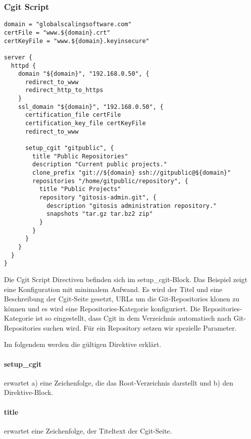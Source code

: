\subsubsection{Cgit Script}

\begin{lstlisting}[style=Java, caption=Beispiel Cgit Script]
domain = "globalscalingsoftware.com"
certFile = "www.${domain}.crt"
certKeyFile = "www.${domain}.keyinsecure"

server {
  httpd {
    domain "${domain}", "192.168.0.50", {
      redirect_to_www
      redirect_http_to_https
    }
    ssl_domain "${domain}", "192.168.0.50", {
      certification_file certFile
      certification_key_file certKeyFile
      redirect_to_www

      setup_cgit "gitpublic", {
        title "Public Repositories"
        description "Current public projects."
        clone_prefix "git://${domain} ssh://gitpublic@${domain}"
        repositories "/home/gitpublic/repository", {
          title "Public Projects"
          repository "gitosis-admin.git", {
            description "gitosis administration repository."
            snapshots "tar.gz tar.bz2 zip"
          }
        }
      }
    }
  }
}
\end{lstlisting}

Die Cgit Script Directiven befinden sich im setup\_cgit-Block. Das Beispiel
zeigt eine Konfiguration mit minimalem Aufwand. Es wird der Titel und eine
Beschreibung der Cgit-Seite gesetzt, URLs um die Git-Repositories klonen zu
können und es wird eine Repositories-Kategorie konfiguriert. Die
Repositories-Kategorie ist so eingestellt, dass Cgit in dem Verzeichnis
automatisch nach Git-Repositories suchen wird. Für ein Repository setzen wir
spezielle Parameter.

Im folgendem werden die gültigen Direktive erklärt.

\paragraph{setup\_cgit}

 erwartet a) eine Zeichenfolge, die das Root-Verzeichnis
darstellt und b) den Direktive-Block.

\paragraph{title}

 erwartet eine Zeichenfolge, der Titeltext der Cgit-Seite.

